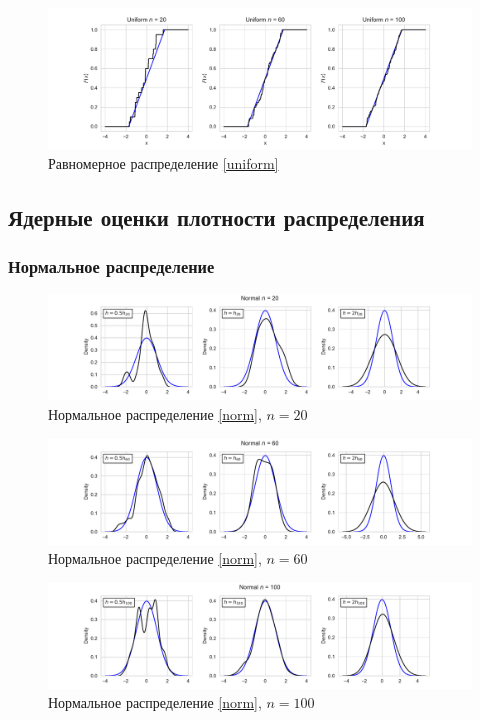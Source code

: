 \documentclass[a4paper]{article}
\begin{document}
\begin{figure}[H]
    \centering
    \includegraphics[width = 16 cm]{resources/uniformECDF.pdf}
    \caption{Равномерное распределение \eqref{uniform}}
    \label{fig:uniformECDF}
\end{figure}
\subsection{Ядерные оценки плотности распределения}
\subsubsection{Нормальное распределение}
\begin{figure}[H]
    \centering
    \includegraphics[width = 16 cm]{resources/normalKde20.pdf}
    \caption{Нормальное распределение \eqref{norm}, $n = 20$}
    \label{fig:normKDE20}
\end{figure}
\begin{figure}[H]
    \centering
    \includegraphics[width = 16 cm]{resources/normalKde60.pdf}
    \caption{Нормальное распределение \eqref{norm}, $n = 60$}
    \label{fig:normKDE60}
\end{figure}
\begin{figure}[H]
    \centering
    \includegraphics[width = 16 cm]{resources/normalKde100.pdf}
    \caption{Нормальное распределение \eqref{norm}, $n = 100$}
    \label{fig:normKDE100}
\end{figure}
\end{document}
